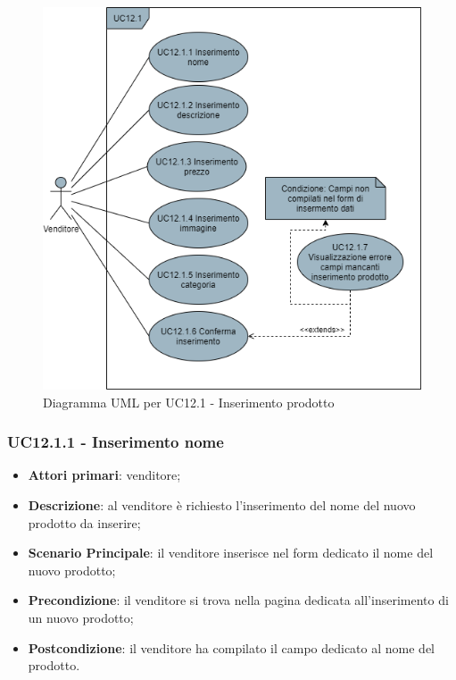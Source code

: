 \begin{figure}[H]
\centering
\includegraphics[scale=0.6]{res/UseCase/Immagini/InserimentoProdotto}
\caption{Diagramma UML per UC12.1 - Inserimento prodotto}
\end{figure}

\subsubsection{UC12.1.1 - Inserimento nome}
\begin{itemize}
\item \textbf{Attori primari}: venditore;
\item \textbf{Descrizione}: al venditore è richiesto l'inserimento del nome del nuovo prodotto da inserire;
\item \textbf{Scenario Principale}: il venditore inserisce nel form dedicato il nome del nuovo prodotto;
\item \textbf{Precondizione}: il venditore si trova nella pagina dedicata all'inserimento di un nuovo prodotto;
\item \textbf{Postcondizione}: il venditore ha compilato il campo dedicato al nome del prodotto.
\end{itemize}

